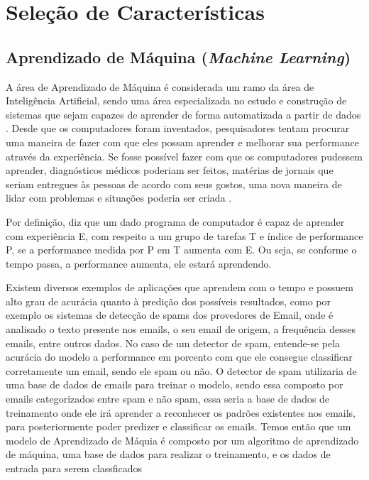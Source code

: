 \chapter[Seleção de Características]{Seleção de Características}

\section{Aprendizado de Máquina (\textit{Machine Learning})}

A área de Aprendizado de Máquina é considerada um ramo da área de Inteligência Artificial, sendo uma
área especializada no estudo e construção de sistemas que sejam capazes de aprender de
forma automatizada a partir de dados \cite{brink2014}. Desde que os computadores foram inventados, pesquisadores tentam procurar uma maneira de fazer com que eles possam aprender e melhorar sua performance através da experiência. Se fosse possível fazer com que os computadores pudessem aprender, diagnósticos médicos poderiam ser feitos, matérias de jornais que seriam entregues às pessoas de acordo com seus gostos, uma nova maneira de lidar com problemas e situações poderia ser criada \cite{mitchell_1997}.

Por definição,  diz que um dado programa de computador é capaz de aprender com experiência E, com respeito a um grupo de tarefas T e índice de performance P, se a performance medida por P em T aumenta com E. Ou seja, se conforme o tempo passa, a performance aumenta, ele estará aprendendo.

Existem diversos exemplos de aplicações que aprendem com o tempo e possuem alto grau de acurácia quanto à predição dos possíveis resultados, como por exemplo os sistemas de detecção de spams dos provedores de Email, onde é analisado o texto presente nos emails, o seu email de origem, a frequência desses emails, entre outros dados. No caso de um detector de spam, entende-se pela acurácia do modelo a performance em porcento com que ele consegue classificar corretamente um email, sendo ele spam ou não. O detector de spam utilizaria de uma base de dados de emails para treinar o modelo, sendo essa composto por emails categorizados entre spam e não spam, essa seria a base de dados de treinamento onde ele irá aprender a reconhecer os padrões existentes nos emails, para posteriormente poder predizer e classificar os emails. Temos então que um modelo de Aprendizado de Máquia é composto por um algoritmo de aprendizado de máquina, uma base de dados para realizar o treinamento, e os dados de entrada para serem classficados \cite{mitchell_1997}


